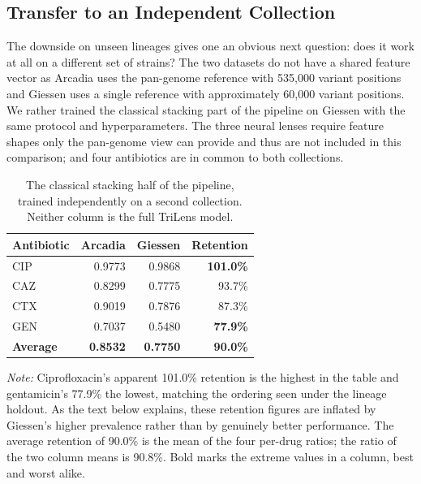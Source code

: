 \documentclass[journal]{IEEEtran}
\begin{document}
\subsection{Transfer to an Independent Collection}

The downside on unseen lineages gives one an obvious next question: does it work at
all on a different set of strains? The two datasets do not have a shared feature
vector as Arcadia uses the pan-genome reference with 535{,}000 variant positions and
Giessen uses a single reference with approximately 60{,}000 variant positions. We
rather trained the classical stacking part of the pipeline on Giessen with the same
protocol and hyperparameters. The three neural lenses require feature shapes only the
pan-genome view can provide and thus are not included in this comparison; and four
antibiotics are in common to both collections.

\begin{table}[!tb]
\caption{The classical stacking half of the pipeline, trained independently on a
second collection. Neither column is the full TriLens model.}
\label{tab:giessen_transfer}
\centering
\small
\setlength{\tabcolsep}{4pt}
\renewcommand{\arraystretch}{1.05}
\begin{tabular}{|l|r|r|r|}
\hline
\rowcolor{headgrey}
\textbf{Antibiotic} & \textbf{Arcadia} & \textbf{Giessen} & \textbf{Retention} \\ \hline
CIP & 0.9773 & 0.9868 & \textbf{101.0\%} \\ \hline
CAZ & 0.8299 & 0.7775 & 93.7\% \\ \hline
CTX & 0.9019 & 0.7876 & 87.3\% \\ \hline
GEN & 0.7037 & 0.5480 & \textbf{77.9\%} \\ \hline
\rowcolor{oursblue}
\textbf{Average} & \textbf{0.8532} & \textbf{0.7750} & \textbf{90.0\%} \\ \hline
\end{tabular}
\renewcommand{\arraystretch}{1.0}
\vspace{0.4em}

\noindent\footnotesize\textit{Note:} Ciprofloxacin's apparent 101.0\% retention is the highest in
the table and gentamicin's 77.9\% the lowest, matching the ordering seen under the lineage
holdout. As the text below explains, these retention figures are inflated by Giessen's higher
prevalence rather than by genuinely better performance. The average retention of 90.0\% is
the mean of the four per-drug ratios; the ratio of the two column means is 90.8\%. Bold marks
the extreme values in a column, best and worst alike.
\end{table}
\end{document}
